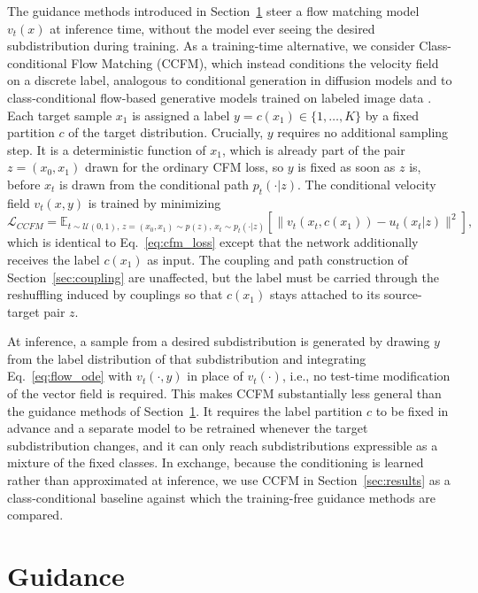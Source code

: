 \documentclass{article}
\begin{document}
The guidance methods introduced in Section~\ref{sec:guidance} steer a flow matching model $v_t(x)$ at inference time, without the model ever seeing the desired subdistribution during training.
As a training-time alternative, we consider Class-conditional Flow Matching (CCFM), which instead conditions the velocity field on a discrete label, analogous to conditional generation in diffusion models \citep{ho2022classifier} and to class-conditional flow-based generative models trained on labeled image data \citep{ma2024sit}.
Each target sample $x_1$ is assigned a label $y = c(x_1) \in \{1,\dots,K\}$ by a fixed partition $c$ of the target distribution.
Crucially, $y$ requires no additional sampling step.
It is a deterministic function of $x_1$, which is already part of the pair $z=(x_0,x_1)$ drawn for the ordinary CFM loss, so $y$ is fixed as soon as $z$ is, before $x_t$ is drawn from the conditional path $p_t(\cdot|z)$.
The conditional velocity field $v_t(x,y)$ is trained by minimizing
\begin{equation}
    \mathcal{L}_{CCFM} = \mathbb{E}_{t \sim \mathcal{U}(0,1),\, z=(x_0,x_1) \sim p(z),\, x_t \sim p_t(\cdot|z)} \left[ \| v_t(x_t, c(x_1)) - u_t(x_t|z) \|^2 \right],
    \label{eq:ccfm_loss}
\end{equation}
which is identical to Eq.~\eqref{eq:cfm_loss} except that the network additionally receives the label $c(x_1)$ as input.
The coupling and path construction of Section~\ref{sec:coupling} are unaffected, but the label must be carried through the reshuffling induced by couplings so that $c(x_1)$ stays attached to its source-target pair $z$.

At inference, a sample from a desired subdistribution is generated by drawing $y$ from the label distribution of that subdistribution and integrating Eq.~\eqref{eq:flow_ode} with $v_t(\cdot,y)$ in place of $v_t(\cdot)$, i.e., no test-time modification of the vector field is required.
This makes CCFM substantially less general than the guidance methods of Section~\ref{sec:guidance}.
It requires the label partition $c$ to be fixed in advance and a separate model to be retrained whenever the target subdistribution changes, and it can only reach subdistributions expressible as a mixture of the fixed classes.
In exchange, because the conditioning is learned rather than approximated at inference, we use CCFM in Section~\ref{sec:results} as a class-conditional baseline against which the training-free guidance methods are compared.

\section{Guidance}
\label{sec:guidance}
\end{document}
